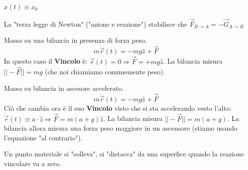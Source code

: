 \begin{example} \label{es-rez-vin-1}
    $x(t) \equiv x_0$ %
\end{example}
\hspace{-15pt}La "terza legge di Newton" ("azione e reazione") stabilisce che $\vec{F}_{B\to A} = -\vec{G}_{A \to B}$
\begin{example} \label{es-rez-vin-2}
    Massa su una bilancia in presenza di forza peso.
    $$m\ddot{\vec{r}}(t) = -mg\hat{z} + \vec{F}$$
    In questo caso il \textbf{Vincolo} è: $\dot{\vec{r}}(t) = 0 \Rightarrow \vec{F} = +mg\hat{z}$. La bilancia misura $||-\vec{F}|| = mg$ (che noi chiamiamo comunemente peso).
\end{example}
\begin{example} \label{es-rez-vin-3}
    Massa su bilancia in ascesore accelerato.
    $$m\ddot{\vec{r}}(t) = -mg\hat{z} + \vec{F}$$
    Ciò che cambia ora è il suo \textbf{Vincolo} visto che si sta accelerando vesto l'alto: $\ddot{\vec{r}}(t) \equiv a \cdot \hat{z} \Rightarrow \vec{F}= m(a+g)\hat{z}$. La bilancia misura $||-\vec{F}|| = m(a+g)$.
    La bilancia allora misura una forza peso maggiore in un ascensore (stiamo usando l'equazione "al contrario").
\end{example}
\begin{note}
    Un punto materiale si "solleva", si "distacca" da una superfice quando la reazione vincolare va a zero.
\end{note}
